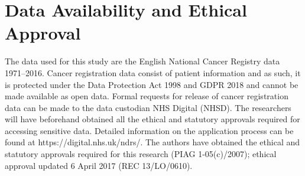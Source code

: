 \documentclass[12pt]{article}
\begin{document}
\section*{Data Availability and Ethical Approval}

The data used for this study are the English National Cancer Registry data 1971–2016. Cancer registration data consist of patient information and as such, it is protected under the Data Protection Act 1998 and GDPR 2018 and cannot be made available as open data. Formal requests for release of cancer registration data can be made to the data custodian NHS Digital (NHSD). The researchers will have beforehand obtained all the ethical and statutory approvals required for accessing sensitive data. Detailed information on the application process can be found at https://digital.nhs.uk/ndrs/. The authors have obtained the ethical and statutory approvals required for this research (PIAG 1-05(c)/2007); ethical approval updated 6 April 2017 (REC 13/LO/0610).








\appendix
\end{document}
